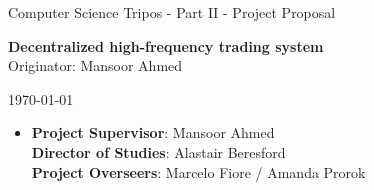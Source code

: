 \documentclass[12p]{report}
\date{October 2019}
\begin{document}


\pagestyle{empty}

\vspace*{40mm}
\begin{center}

\Large

{Computer Science Tripos - Part II - Project Proposal} \\
\vspace*{5mm}

\Huge
{\bf Decentralized high-frequency trading system} \\

\vspace{5mm}
\Large
{Originator: Mansoor Ahmed} \\
\vspace*{1mm}

\today  %
\vspace{10mm}
\end{center}

\begin{itemize}[label={},leftmargin=-10mm]
\item 
{{\bf Project Supervisor}: Mansoor Ahmed} \\
{{\bf Director of Studies}: Alastair Beresford} \\
{{\bf Project Overseers}: Marcelo Fiore / Amanda Prorok} \\

\end{itemize}
\end{document}
